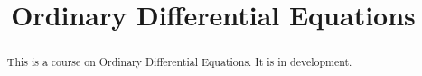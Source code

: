 \documentclass[12pt]{xourse}
\title{Ordinary Differential Equations}
\begin{document}
\begin{abstract}
This is a course on Ordinary Differential Equations. It is in development.
\end{abstract} 

\maketitle

\end{document}
